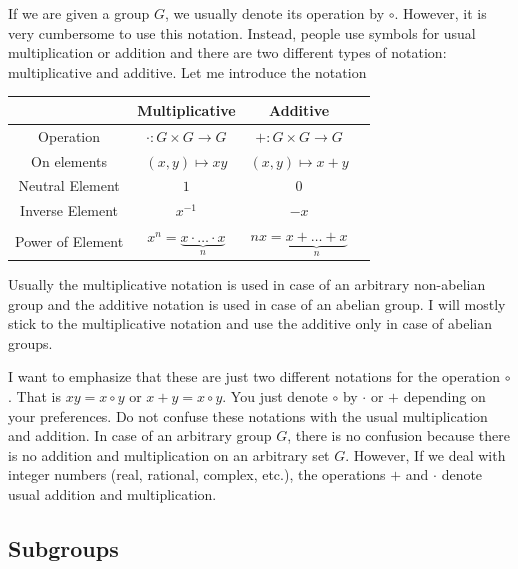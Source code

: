 If we are given a group $G$, we usually denote its operation by $\circ$.
However, it is very cumbersome to use this notation.
Instead, people use symbols for usual multiplication or addition and there are two different types of notation: multiplicative and additive.
Let me introduce the notation
\begin{center}
\begin{tabular}{c|c|c|c}
{}&{Multiplicative}&{Additive}\\
\hline
{Operation}&{$\cdot \colon G\times G\to G$}&{$+\colon G\times G\to G$}\\
{On elements}&{$(x, y)\mapsto xy$}&{$(x,y)\mapsto x+y$}\\
{Neutral Element}&{$1$}&{$0$}\\
{Inverse Element}&{$x^{-1}$}&{$-x$}\\
{Power of Element}&{$x^n = \underbrace{x \cdot\ldots \cdot x}_n$}&{$nx = \underbrace{x + \ldots + x}_n$}\\
\end{tabular}
\end{center}
Usually the multiplicative notation is used in case of an arbitrary non-abelian group and the additive notation is used in case of an abelian group.
I will mostly stick to the multiplicative notation and use the additive only in case of abelian groups.

I want to emphasize that these are just two different notations for the operation $\circ$.
That is $xy = x\circ y$ or $x + y = x\circ y$.
You just denote $\circ$ by $\cdot$ or $+$ depending on your preferences.
Do not confuse these notations with the usual multiplication and addition.
In case of an arbitrary group $G$, there is no confusion because there is no addition and multiplication on an arbitrary set $G$.
However, If we deal with integer numbers (real, rational, complex, etc.), the operations $+$ and $\cdot$ denote usual addition and multiplication.

\subsection{Subgroups}

